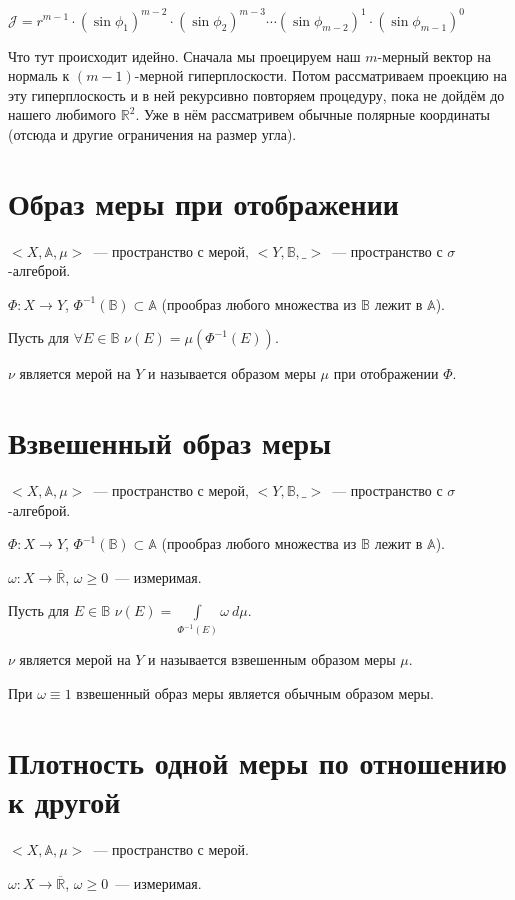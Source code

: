 \documentclass[paper=a4, fontsize=14pt]{report}
\begin{document}
$\mathcal{J} = r^{m-1} \cdot (\sin \phi_1)^{m-2} \cdot (\sin \phi_2)^{m-3} \cdots (\sin \phi_{m-2})^{1} \cdot (\sin \phi_{m-1})^{0}$

Что тут происходит идейно. Сначала мы проецируем наш $m$-мерный вектор на нормаль к $(m-1)$-мерной гиперплоскости. Потом рассматриваем проекцию на эту гиперплоскость и в ней рекурсивно повторяем процедуру, пока не дойдём до нашего любимого $\mathds{R}^2$. Уже в нём рассматривем обычные полярные координаты (отсюда и другие ограничения на размер угла).

\section{Образ меры при отображении}
$<X, \mathds{A}, \mu>$~--- пространство с мерой, $<Y, \mathds{B}, \_>$~--- пространство с $\sigma$-алгеброй.

$\Phi: X \to Y$, $\Phi^{-1}(\mathds{B}) \subset \mathds{A}$ (прообраз любого множества из $\mathds{B}$ лежит в $\mathds{A}$).

Пусть для $\forall E \in \mathds{B}$ $\nu(E) = \mu(\Phi^{-1}(E))$.

$\nu$ является мерой на $Y$ и называется образом меры $\mu$ при отображении $\Phi$.

\section{Взвешенный образ меры}
$<X, \mathds{A}, \mu>$~--- пространство с мерой, $<Y, \mathds{B}, \_>$~--- пространство с $\sigma$-алгеброй.

$\Phi: X \to Y$, $\Phi^{-1}(\mathds{B}) \subset \mathds{A}$ (прообраз любого множества из $\mathds{B}$ лежит в $\mathds{A}$).

$\omega: X \to \overline{\mathds{R}}$, $\omega \geq 0$~--- измеримая.

Пусть для $E \in \mathds{B}$ $\nu(E) = \int\limits_{\Phi^{-1}(E)} \omega~d\mu$.

$\nu$ является мерой на $Y$ и называется взвешенным образом меры $\mu$.

При $\omega \equiv 1$ взвешенный образ меры является обычным образом меры.

\section{Плотность одной меры по отношению к другой}
$<X, \mathds{A}, \mu>$~--- пространство с мерой.

$\omega: X \to \overline{\mathds{R}}$, $\omega \geq 0$~--- измеримая.
\end{document}

